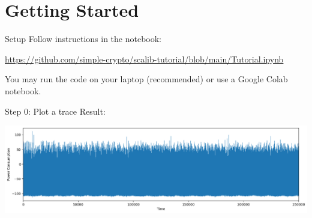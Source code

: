 \documentclass[aspectratio=169]{beamer}
\begin{document}
\section{Getting Started}
\begin{frame}{Setup}
    Follow instructions in the notebook:
    \begin{center}
        \url{https://github.com/simple-crypto/scalib-tutorial/blob/main/Tutorial.ipynb}
    \end{center}

    You may run the code on your laptop (recommended) or use a Google Colab notebook.

\end{frame}


\begin{frame}{Step 0: Plot a trace}
    Result:
    \begin{center}
        \includegraphics[width=\textwidth]{figures/res_step0.png}
    \end{center}
\end{frame}
\end{document}
